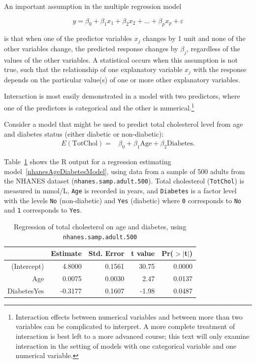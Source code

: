 An important assumption in the multiple regression model

\[y = \beta_0 + \beta_1x_1 + \beta_2x_2 + ... + \beta_px_p + \varepsilon \] 

is that when one of the predictor variables $x_j$ changes by 1 unit and none of the other variables change, the predicted response changes by $\beta_j$, regardless of the values of the other variables.  A statistical  occurs when this assumption is not true, such that the relationship of one explanatory variable $x_j$ with the response depends on the particular value(s) of one or more other explanatory variables.

Interaction is most easily demonstrated in a model with two predictors, where one of the predictors is categorical and the other is numerical.\footnote{Interaction effects between numerical variables and between more than two variables can be complicated to interpret. A more complete treatment of interaction is best left to a more advanced course; this text will only examine interaction in the setting of models with one categorical variable and one numerical variable.}

Consider a model that might be used to predict total cholesterol level from age and diabetes status (either diabetic or non-diabetic):
\begin{align}
E(\text{TotChol}) =& \beta_0 + \beta_1\text{Age} + \beta_2\text{Diabetes}.
\label{nhanesAgeDiabetesModel}
\end{align}

Table~\ref{nhanesAgeDiabetes} shows the \textsf{R} output for a regression estimating model~\ref{nhanesAgeDiabetesModel}, using data from a sample of 500 adults from the NHANES dataset (\texttt{nhanes.samp.adult.500}). Total cholesterol (\texttt{TotChol}) is measured in mmol/L, \texttt{Age} is recorded in years, and \texttt{Diabetes} is a factor level with the levels \texttt{No} (non-diabetic) and \texttt{Yes} (diabetic) where \texttt{0} corresponds to \texttt{No} and \texttt{1} corresponds to \texttt{Yes}.

\begin{table}[ht]
	\centering
	\begin{tabular}{rrrrr}
		\hline
		& Estimate & Std. Error & t value & Pr($>$$|$t$|$) \\ 
		\hline
		(Intercept) & 4.8000 & 0.1561 & 30.75 & 0.0000 \\ 
		Age & 0.0075 & 0.0030 & 2.47 & 0.0137 \\ 
		DiabetesYes & -0.3177 & 0.1607 & -1.98 & 0.0487 \\ 
		\hline
	\end{tabular}
	\caption{Regression of total cholesterol on age and diabetes, 
		using \texttt{nhanes.samp.adult.500}} 
	\label{nhanesAgeDiabetes}
\end{table}

